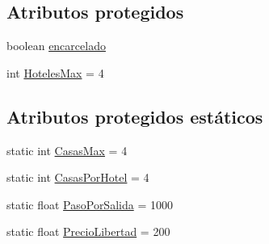 \subsection*{Atributos protegidos}
\begin{DoxyCompactItemize}
\item 
boolean \hyperlink{classcivitas_1_1Jugador_a122f45dd187677cdb7b4367f4a8c8e31}{encarcelado}
\item 
int \hyperlink{classcivitas_1_1Jugador_a58a742df083ab5154311eb24a9f336f7}{Hoteles\+Max} = 4
\end{DoxyCompactItemize}
\subsection*{Atributos protegidos estáticos}
\begin{DoxyCompactItemize}
\item 
static int \hyperlink{classcivitas_1_1Jugador_accf59fcd81d2ef278ff30ec2d94459f7}{Casas\+Max} = 4
\item 
static int \hyperlink{classcivitas_1_1Jugador_a784c20415185896630b61dc4e32c2ad4}{Casas\+Por\+Hotel} = 4
\item 
static float \hyperlink{classcivitas_1_1Jugador_a7bf24661b9223d34e9e0b8640183de67}{Paso\+Por\+Salida} = 1000
\item 
static float \hyperlink{classcivitas_1_1Jugador_a2903b8379dc2dfcccab28821a41c7afc}{Precio\+Libertad} = 200
\end{DoxyCompactItemize}
